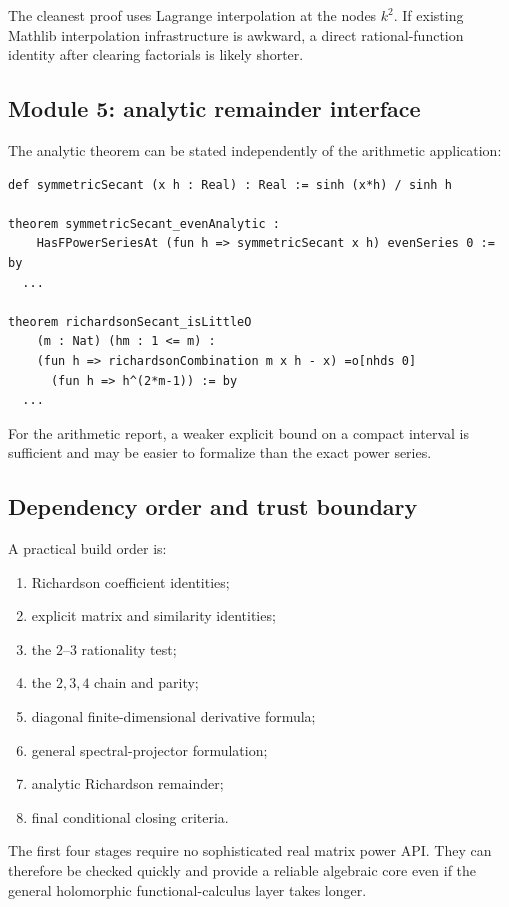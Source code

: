 \documentclass[11pt,oneside]{article}
\theoremstyle{definition}
\theoremstyle{remark}
\begin{document}
The cleanest proof uses Lagrange interpolation at the nodes $k^2$.  If existing Mathlib
interpolation infrastructure is awkward, a direct rational-function identity after clearing
factorials is likely shorter.

\subsection{Module 5: analytic remainder interface}

The analytic theorem can be stated independently of the arithmetic application:

\begin{lstlisting}[style=leanstyle,caption={Schematic analytic interface.}]
def symmetricSecant (x h : Real) : Real := sinh (x*h) / sinh h

theorem symmetricSecant_evenAnalytic :
    HasFPowerSeriesAt (fun h => symmetricSecant x h) evenSeries 0 := by
  ...

theorem richardsonSecant_isLittleO
    (m : Nat) (hm : 1 <= m) :
    (fun h => richardsonCombination m x h - x) =o[nhds 0]
      (fun h => h^(2*m-1)) := by
  ...
\end{lstlisting}

For the arithmetic report, a weaker explicit bound on a compact interval is sufficient and may
be easier to formalize than the exact power series.

\subsection{Dependency order and trust boundary}

A practical build order is:
\begin{enumerate}
\item Richardson coefficient identities;
\item explicit matrix and similarity identities;
\item the $2$--$3$ rationality test;
\item the $2,3,4$ chain and parity;
\item diagonal finite-dimensional derivative formula;
\item general spectral-projector formulation;
\item analytic Richardson remainder;
\item final conditional closing criteria.
\end{enumerate}

The first four stages require no sophisticated real matrix power API.  They can therefore be
checked quickly and provide a reliable algebraic core even if the general holomorphic
functional-calculus layer takes longer.
\end{document}
